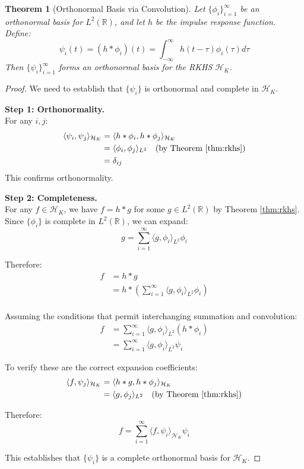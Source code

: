 \documentclass{article}
\newtheorem{theorem}{Theorem}
\begin{document}
\begin{theorem}[Orthonormal Basis via Convolution]
\label{thm:basis}
Let $\{\phi_i\}_{i=1}^{\infty}$ be an orthonormal basis for $L^2(\mathbb{R})$, and let $h$ be the impulse response function. Define:
\begin{equation}
\psi_i(t) = (h * \phi_i)(t) = \int_{-\infty}^{\infty} h(t-\tau)\phi_i(\tau)d\tau
\end{equation}
Then $\{\psi_i\}_{i=1}^{\infty}$ forms an orthonormal basis for the RKHS $\mathcal{H}_K$.
\end{theorem}

\begin{proof}
We need to establish that $\{\psi_i\}$ is orthonormal and complete in $\mathcal{H}_K$.

\textbf{Step 1: Orthonormality.}\\
For any $i, j$:
\begin{align}
\langle \psi_i, \psi_j \rangle_{\mathcal{H}_K} &= \langle h * \phi_i, h * \phi_j \rangle_{\mathcal{H}_K}\\
&= \langle \phi_i, \phi_j \rangle_{L^2} \quad \text{(by Theorem \ref{thm:rkhs})}\\
&= \delta_{ij}
\end{align}
This confirms orthonormality.

\textbf{Step 2: Completeness.}\\
For any $f \in \mathcal{H}_K$, we have $f = h * g$ for some $g \in L^2(\mathbb{R})$ by Theorem \ref{thm:rkhs}. Since $\{\phi_i\}$ is complete in $L^2(\mathbb{R})$, we can expand:
\begin{equation}
g = \sum_{i=1}^{\infty} \langle g, \phi_i \rangle_{L^2} \phi_i
\end{equation}

Therefore:
\begin{align}
f &= h * g\\
&= h * \left(\sum_{i=1}^{\infty} \langle g, \phi_i \rangle_{L^2} \phi_i\right)\\
\end{align}

Assuming the conditions that permit interchanging summation and convolution:
\begin{align}
f &= \sum_{i=1}^{\infty} \langle g, \phi_i \rangle_{L^2} (h * \phi_i)\\
&= \sum_{i=1}^{\infty} \langle g, \phi_i \rangle_{L^2} \psi_i
\end{align}

To verify these are the correct expansion coefficients:
\begin{align}
\langle f, \psi_j \rangle_{\mathcal{H}_K} &= \langle h * g, h * \phi_j \rangle_{\mathcal{H}_K}\\
&= \langle g, \phi_j \rangle_{L^2} \quad \text{(by Theorem \ref{thm:rkhs})}
\end{align}

Therefore:
\begin{equation}
f = \sum_{i=1}^{\infty} \langle f, \psi_i \rangle_{\mathcal{H}_K} \psi_i
\end{equation}

This establishes that $\{\psi_i\}$ is a complete orthonormal basis for $\mathcal{H}_K$.
\end{proof}
\end{document}
